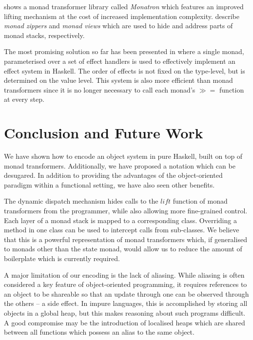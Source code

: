 \documentclass[runningheads,a4paper]{llncs}
\begin{document}
\cite{jaskelioff2011monatron} shows a monad transformer library called \emph{Monatron} which features an improved lifting mechanism at the cost of increased implementation complexity. \cite{schrijvers2011monads} describe \emph{monad zippers} and \emph{monad views} which are used to hide and address parts of monad stacks, respectively.

The most promising solution so far has been presented in \cite{kiselyov2013extensible} where a single monad, parameterised over a set of effect handlers \cite{plotkin2009handlers} is used to effectively implement an effect system in Haskell. The order of effects is not fixed on the type-level, but is determined on the value level. This system is also more efficient than monad transformers since it is no longer necessary to call each monad's $\gg\!\!=$ function at every step. 

\section{Conclusion and Future Work}
\label{sec:conclusions}

We have shown how to encode an object system in pure Haskell, built on top of monad transformers. Additionally, we have proposed a notation which can be desugared. In addition to providing the advantages of the object-oriented paradigm within a functional setting, we have also seen other benefits.

The dynamic dispatch mechanism hides calls to the $\mathit{lift}$ function of monad transformers from the programmer, while also allowing more fine-grained control. Each layer of a monad stack is mapped to a corresponding class. Overriding a method in one class can be used to intercept calls from sub-classes. We believe that this is a powerful representation of monad transformers which, if generalised to monads other than the state monad, would allow us to reduce the amount of boilerplate which is currently required.

A major limitation of our encoding is the lack of aliasing. While aliasing is often considered a key feature of object-oriented programming, it requires references to an object to be shareable so that an update through one can be observed through the others -- a side effect. In impure languages, this is accomplished by storing all objects in a global heap, but this makes reasoning about such programs difficult. A good compromise may be the introduction of localised heaps which are shared between all functions which possess an alias to the same object. 
\end{document}
